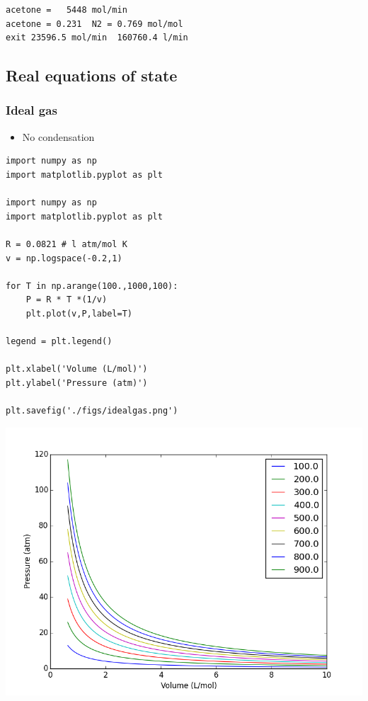 \documentclass[11pt]{article}
\begin{document}
\begin{verbatim}
acetone =   5448 mol/min
acetone = 0.231  N2 = 0.769 mol/mol
exit 23596.5 mol/min  160760.4 l/min
\end{verbatim}

\subsection{Real equations of state}
\label{sec-7-4}
\subsubsection{Ideal gas}
\label{sec-7-4-1}
\begin{itemize}
\item No condensation
\end{itemize}

\begin{verbatim}
import numpy as np
import matplotlib.pyplot as plt

import numpy as np
import matplotlib.pyplot as plt

R = 0.0821 # l atm/mol K
v = np.logspace(-0.2,1)

for T in np.arange(100.,1000,100):
    P = R * T *(1/v)
    plt.plot(v,P,label=T)

legend = plt.legend()

plt.xlabel('Volume (L/mol)')
plt.ylabel('Pressure (atm)')

plt.savefig('./figs/idealgas.png')
\end{verbatim}

\includegraphics[width=.9\linewidth]{./figs/idealgas.png}
\end{document}

